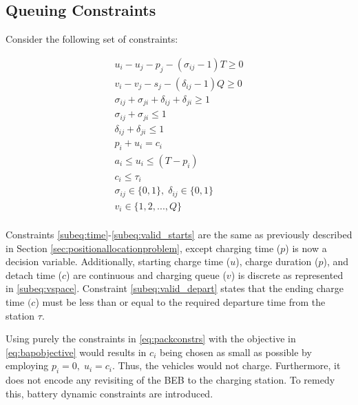 \documentclass[letterpaper, 10pt, conference]{IEEEtran}
\begin{document}
\subsection{Queuing Constraints}
\noindent
Consider the following set of constraints:

\begin{subequations}
\label{eq:packconstrs}
\begin{align}
    u_i - u_j - p_j - (\sigma_{ij} - 1)T \geq 0                      \label{subeq:time}         \\
    v_i - v_j - s_j - (\delta_{ij} - 1)Q \geq 0                      \label{subeq:space}        \\
    \sigma_{ij} + \sigma_{ji} + \delta_{ij} + \delta_{ji} \geq 1     \label{subeq:valid_pos}    \\
    \sigma_{ij} + \sigma_{ji} \leq 1                                 \label{subeq:sigma}        \\
    \delta_{ij} + \delta_{ji} \leq 1                                 \label{subeq:delta}        \\
    p_i + u_i = c_i                                                  \label{subeq:detach}       \\
    a_i \leq u_i \leq (T - p_i)                                      \label{subeq:valid_starts} \\
    c_i \leq \tau_i                                                  \label{subeq:valid_depart} \\
    \sigma_{ij} \in \{0,1\},\;\delta_{ij} \in \{0,1\}                \label{subeq:sdspace}      \\
    v_i \in \{1,2, ... , Q\}                                         \label{subeq:vspace}        \\
\end{align}
\end{subequations}

Constraints \eqref{subeq:time}-\eqref{subeq:valid_starts} are the same as previously described in Section \ref{sec:positionallocationproblem}, except charging time (\(p\)) is now a decision variable. Additionally, starting charge time (\(u\)), charge duration (\(p\)), and detach time (\(c\)) are continuous and charging queue (\(v\)) is discrete as represented in \eqref{subeq:vspace}. Constraint \eqref{subeq:valid_depart} states that the ending charge time \((c\)) must be less than or equal to the required departure time from the station \(\tau\).

Using purely the constraints in \eqref{eq:packconstrs} with the objective in \eqref{eq:bapobjective} would results in \(c_i\) being chosen as small as possible by employing \(p_i = 0,\; u_i = c_i\). Thus, the vehicles would not charge. Furthermore, it does not encode any revisiting of the BEB to the charging station. To remedy this, battery dynamic constraints are introduced.
\end{document}
